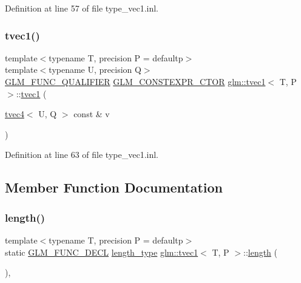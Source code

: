 Definition at line 57 of file type\+\_\+vec1.\+inl.

\mbox{\label{structglm_1_1tvec1_a37a72fd06b4e08a6f6d5e7d85219435b}} 
\subsubsection{\texorpdfstring{tvec1()}{tvec1()}\hspace{0.1cm}{\footnotesize\ttfamily [14/14]}}
{\footnotesize\ttfamily template$<$typename T, precision P = defaultp$>$ \\
template$<$typename U, precision Q$>$ \\
\mbox{\hyperlink{setup_8hpp_a33fdea6f91c5f834105f7415e2a64407}{G\+L\+M\+\_\+\+F\+U\+N\+C\+\_\+\+Q\+U\+A\+L\+I\+F\+I\+ER}} \mbox{\hyperlink{setup_8hpp_ad34178a09666081abdb573c14d1f4a5a}{G\+L\+M\+\_\+\+C\+O\+N\+S\+T\+E\+X\+P\+R\+\_\+\+C\+T\+OR}} \mbox{\hyperlink{structglm_1_1tvec1}{glm\+::tvec1}}$<$ T, P $>$\+::\mbox{\hyperlink{structglm_1_1tvec1}{tvec1}} (\begin{DoxyParamCaption}\item[{\mbox{\hyperlink{structglm_1_1tvec4}{tvec4}}$<$ U, Q $>$ const \&}]{v }\end{DoxyParamCaption})}



Definition at line 63 of file type\+\_\+vec1.\+inl.



\subsection{Member Function Documentation}
\mbox{\label{structglm_1_1tvec1_aa25cb652c92eb83b9ef027d82365bb01}} 
\subsubsection{\texorpdfstring{length()}{length()}}
{\footnotesize\ttfamily template$<$typename T, precision P = defaultp$>$ \\
static \mbox{\hyperlink{setup_8hpp_ab2d052de21a70539923e9bcbf6e83a51}{G\+L\+M\+\_\+\+F\+U\+N\+C\+\_\+\+D\+E\+CL}} \mbox{\hyperlink{structglm_1_1tvec1_ae6254cf662020a8328b744b40f419527}{length\+\_\+type}} \mbox{\hyperlink{structglm_1_1tvec1}{glm\+::tvec1}}$<$ T, P $>$\+::\mbox{\hyperlink{glad_8h_a1499969c13207ed8ab6f796685d4933f}{length}} (\begin{DoxyParamCaption}{ }\end{DoxyParamCaption})\hspace{0.3cm}{\ttfamily [inline]}, {\ttfamily [static]}}



